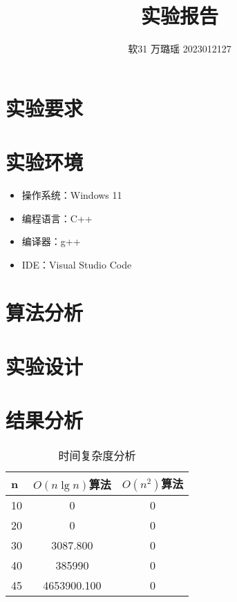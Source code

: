 \documentclass[a4paper,9pt]{article}
\begin{document}
\title{实验报告}
\author{软31 万璐瑶 2023012127}
\maketitle
\section{实验要求}

\section{实验环境}
\begin{itemize}
    \item 操作系统：Windows 11
    \item 编程语言：C++
    \item 编译器：g++
    \item IDE：Visual Studio Code
\end{itemize}

\section{算法分析}




\section{实验设计}

\section{结果分析}
\begin{table}[!htp]
    \centering
    \caption{时间复杂度分析}
    \begin{tabular}{l|c|c}
        \hline
        n  & $O(n\lg n)$算法 & $O(n^2)$算法\\
        \hline
        10 & 0 & 0 \\
        \hline
        20 & 0 & 0 \\
        \hline
        30 & 3087.800 & 0 \\
        \hline
        40 & 385990 & 0 \\
        \hline
        45 & 4653900.100 & 0 \\
        \hline
    \end{tabular}
\end{table}
\end{document}
